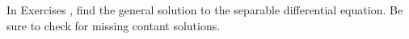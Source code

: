 {\noindent In Exercises}
{, find the general solution to the separable differential equation.  Be sure to check for missing contant solutions.}
